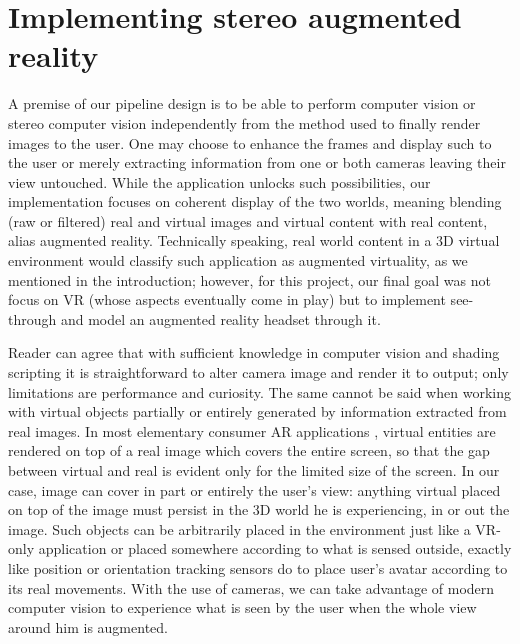 \section{Implementing stereo augmented reality}
A premise of our pipeline design is to be able to perform computer vision or stereo computer vision independently from the method used to finally render images to the user. One may choose to enhance the frames and display such to the user or merely extracting information from one or both cameras leaving their view untouched. While the application unlocks such possibilities, our implementation focuses on coherent display of the two worlds, meaning blending (raw or filtered) real and virtual images and virtual content with real content, alias augmented reality. Technically speaking, real world content in a 3D virtual environment would classify such application as augmented virtuality, as we mentioned in the introduction; however, for this project, our final goal was not focus on VR (whose aspects eventually come in play) but to implement see-through and model an augmented reality headset through it.

Reader can agree that with sufficient knowledge in computer vision and shading scripting it is straightforward to alter camera image and render it to output; only limitations are performance and curiosity. The same cannot be said when working with virtual objects partially or entirely generated by information extracted from real images. In most elementary consumer AR applications \cite{link_google_translate_AR} \cite{link_IKEA_AR}, virtual entities are rendered on top of a real image which covers the entire screen, so that the gap between virtual and real is evident only for the limited size of the screen. In our case, image can cover in part or entirely the user's view: anything virtual placed on top of the image must persist in the 3D world he is experiencing, in or out the image. Such objects can be arbitrarily placed in the environment just like a VR-only application or placed somewhere according to what is sensed outside, exactly like position or orientation tracking sensors do to place user's avatar according to its real movements. With the use of cameras, we can take advantage of modern computer vision to experience what is seen by the user when the whole view around him is augmented.

